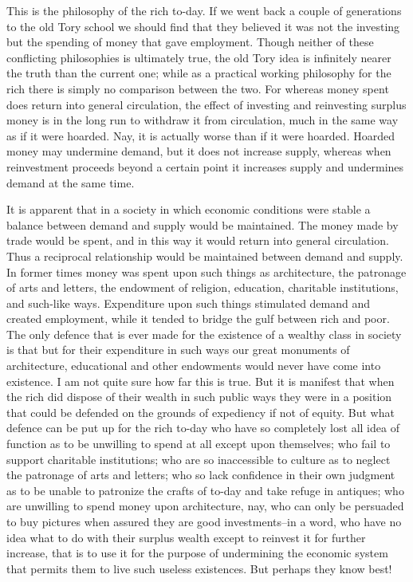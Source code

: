 \documentclass{book}
\begin{document}
This is the philosophy of the rich to-day. If we went back a couple of generations to the old Tory school we should find that they believed it was not the investing but the spending of money that gave employment. Though neither of these conflicting philosophies is ultimately true, the old Tory idea is infinitely nearer the truth than the current one; while as a practical working philosophy for the rich there is simply no comparison between the two. For whereas money spent does return into general circulation, the effect of investing and reinvesting surplus money is in the long run to withdraw it from circulation, much in the same way as if it were hoarded. Nay, it is actually worse than if it were hoarded. Hoarded money may undermine demand, but it does not increase supply, whereas when reinvestment proceeds beyond a certain point it increases supply and undermines demand at the same time.

It is apparent that in a society in which economic conditions were stable a balance between demand and supply would be maintained. The money made by trade would be spent, and in this way it would return into general circulation. Thus a reciprocal relationship would be maintained between demand and supply. In former times money was spent upon such things as architecture, the patronage of arts and letters, the endowment of religion, education, charitable institutions, and such-like ways. Expenditure upon such things stimulated demand and created employment, while it tended to bridge the gulf between rich and poor. The only defence that is ever made for the existence of a wealthy class in society is that but for their expenditure in such ways our great monuments of architecture, educational and other endowments would never have come into existence. I am not quite sure how far this is true. But it is manifest that when the rich did dispose of their wealth in such public ways they were in a position that could be defended on the grounds of expediency if not of equity. But what defence can be put up for the rich to-day who have so completely lost all idea of function as to be unwilling to spend at all except upon themselves; who fail to support charitable institutions; who are so inaccessible to culture as to neglect the patronage of arts and letters; who so lack confidence in their own judgment as to be unable to patronize the crafts of to-day and take refuge in antiques; who are unwilling to spend money upon architecture, nay, who can only be persuaded to buy pictures when assured they are good investments–in a word, who have no idea what to do with their surplus wealth except to reinvest it for further increase, that is to use it for the purpose of undermining the economic system that permits them to live such useless existences. But perhaps they know best!
\end{document}
